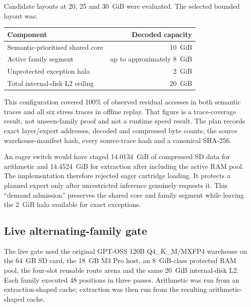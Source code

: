 Candidate layouts at 20, 25 and 30~GiB were evaluated.  The selected bounded
layout was:

\begin{center}
\begin{tabular}{lr}
\toprule
Component & Decoded capacity \\
\midrule
Semantic-prioritised shared core & 10~GiB \\
Active family segment & up to approximately 8~GiB \\
Unprotected exception halo & 2~GiB \\
Total internal-disk L2 ceiling & 20~GiB \\
\bottomrule
\end{tabular}
\end{center}

This configuration covered 100\% of observed residual accesses in both
semantic traces and all six stress traces in offline replay.  That figure is a
trace-coverage result, not unseen-family proof and not a runtime speed result.
The plan records exact layer/expert addresses, decoded and compressed byte
counts, the source warehouse-manifest hash, every source-trace hash and a
canonical SHA-256.

An eager switch would have staged 14.0134~GiB of compressed SD data for
arithmetic and 14.4524~GiB for extraction after including the active RAM pool.
The implementation therefore rejected eager cartridge loading.  It protects a
planned expert only after unrestricted inference genuinely requests it.  This
``demand admission'' preserves the shared core and family segment while
leaving the 2~GiB halo available for exact exceptions.

\subsection{Live alternating-family gate}

The live gate used the original GPT-OSS 120B Q4\_K\_M/MXFP4 warehouse on the
64~GB SD card, the 18~GB M3 Pro host, an 8~GiB-class protected RAM pool, the
four-slot reusable route arena and the same 20~GiB internal-disk L2.  Each
family executed 48 positions in three passes.  Arithmetic was run from an
extraction-shaped cache; extraction was then run from the resulting
arithmetic-shaped cache.

